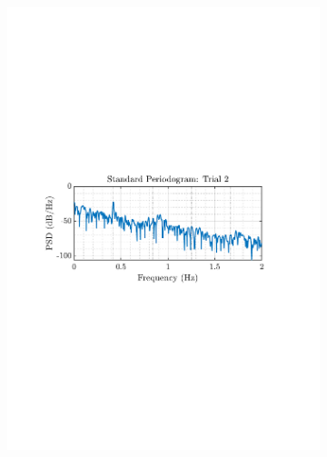 \documentclass[12pt]{article}
\numberwithin{equation}{section}
\begin{document}
\begin{figure}[H]
\begin{subfigure}{0.49\textwidth}
			\includegraphics[trim={2.2cm 11cm 3.15cm  11.2cm}, clip, width=\textwidth]{../MATLAB/figures/q1_5a_fig02.pdf} 
		\end{subfigure}
		\begin{subfigure}{0.49\textwidth}
			\centering

\end{subfigure}
\end{figure}
\end{document}
